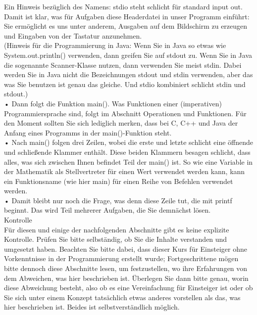 Ein Hinweis bezüglich des Namens: stdio steht schlicht für standard input out. Damit ist klar, was für Aufgaben diese Headerdatei in unser Programm einführt: Sie ermöglicht es uns unter anderem, Ausgaben auf dem Bildschirm zu erzeugen und Eingaben von der Tastatur anzunehmen.\\

(Hinweis für die Programmierung in Java: Wenn Sie in Java so etwas wie System.out.println() verwenden, dann greifen Sie auf stdout zu. Wenn Sie in Java die sogenannte Scanner-Klasse nutzen, dann verwenden Sie meist stdin. Dabei werden Sie in Java nicht die Bezeichnungen stdout und stdin verwenden, aber das was Sie benutzen ist genau das gleiche. Und stdio kombiniert schlicht stdin und stdout.)\\

•	Dann folgt die Funktion main(). Was Funktionen einer (imperativen) Programmiersprache sind, folgt im Abschnitt Operationen und Funktionen. Für den Moment sollten Sie sich lediglich merken, dass bei C, C++ und Java der Anfang eines Programms in der main()-Funktion steht.\\

•	Nach main() folgen drei Zeilen, wobei die erste und letzte schlicht eine öffnende und schließende Klammer enthält. Diese beiden Klammern besagen schlicht, dass alles, was sich zwischen Ihnen befindet Teil der main() ist. So wie eine Variable in der Mathematik als Stellvertreter für einen Wert verwendet werden kann, kann ein Funktionsname (wie hier main) für einen Reihe von Befehlen verwendet werden.\\

•	Damit bleibt nur noch die Frage, was denn diese Zeile tut, die mit printf beginnt. Das wird Teil mehrerer Aufgaben, die Sie demnächst lösen.\\

Kontrolle\\

Für diesen und einige der nachfolgenden Abschnitte gibt es keine explizite Kontrolle. Prüfen Sie bitte selbständig, ob Sie die Inhalte verstanden und umgesetzt haben. Beachten Sie bitte dabei, dass dieser Kurs für Einsteiger ohne Vorkenntnisse in der Programmierung erstellt wurde; Fortgeschrittene mögen bitte dennoch diese Abschnitte lesen, um festzustellen, wo ihre Erfahrungen von dem Abweichen, was hier beschrieben ist. Überlegen Sie dann bitte genau, worin diese Abweichung besteht, also ob es eine Vereinfachung für Einsteiger ist oder ob Sie sich unter einem Konzept tatsächlich etwas anderes vorstellen als das, was hier beschrieben ist. Beides ist selbstverständlich möglich.

